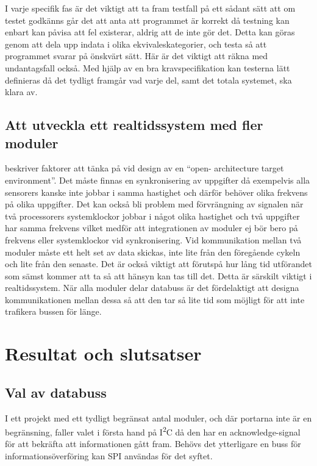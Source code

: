 \documentclass[11pt]{article}
\begin{document}
\begin{flushleft}
I varje specifik fas är det viktigt att ta fram testfall på ett sådant sätt att om testet godkänns går det att anta att programmet är korrekt då testning kan enbart kan påvisa att fel existerar, aldrig att de inte gör det. Detta kan göras genom att dela upp indata i olika ekvivaleskategorier, och testa så att programmet svarar på önskvärt sätt. Här är det viktigt att räkna med undantagsfall också.\cite{tester} Med hjälp av en bra kravspecifikation kan testerna lätt definieras då det tydligt framgår vad varje del, samt det totala systemet, ska klara av. 

\subsection{Att utveckla ett realtidssystem med fler moduler}

\cite{IRS} beskriver faktorer att tänka på vid design av en ``open- architecture target environment''. Det måste finnas en synkronisering av uppgifter då exempelvis alla sensorers kanske inte jobbar i samma hastighet och därför behöver olika frekvens på olika uppgifter. Det kan också bli problem med förvrängning av signalen när två processorers systemklockor jobbar i något olika hastighet och två uppgifter har samma frekvens vilket medför att integrationen av moduler ej bör bero på frekvens eller systemklockor vid synkronisering. Vid kommunikation mellan två moduler måste ett  helt set av data skickas, inte lite från den föregående cykeln och lite från den senaste. Det är också viktigt att förutspå hur lång tid utförandet som sämst kommer att ta så att hänsyn kan tas till det. Detta är särskilt viktigt i realtidssystem. När alla moduler delar databuss är det fördelaktigt att designa kommunikationen mellan dessa så att den tar så lite tid som möjligt för att inte trafikera bussen för länge.   

\pagebreak

\section{Resultat och slutsatser}

\subsection{Val av databuss}
I ett projekt med ett tydligt begränsat antal moduler, och där portarna inte är en begränsning, faller valet i första hand på I\textsuperscript{2}C då den har en acknowledge-signal för att bekräfta att informationen gått fram. Behövs det ytterligare en buss för informationsöverföring kan SPI användas för det syftet.


\end{flushleft}
\end{document}
